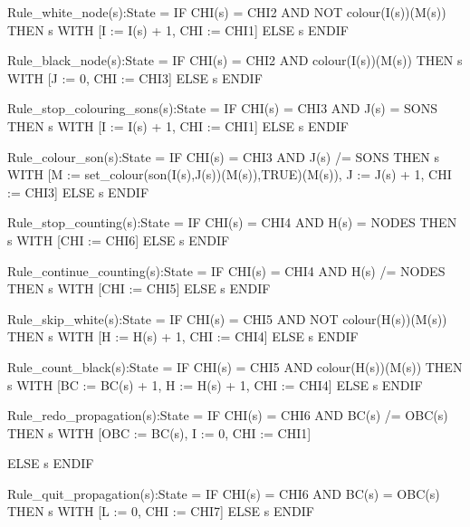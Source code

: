 \begin{smallsession}

  Rule_white_node(s):State =
    IF CHI(s) = CHI2 AND NOT colour(I(s))(M(s)) THEN
      s WITH [I := I(s) + 1,
              CHI := CHI1]
    ELSE 
      s
    ENDIF

  Rule_black_node(s):State =
    IF CHI(s) = CHI2 AND colour(I(s))(M(s)) THEN
      s WITH [J := 0,
              CHI := CHI3]
    ELSE 
      s
    ENDIF


  Rule_stop_colouring_sons(s):State =
    IF CHI(s) = CHI3 AND J(s) = SONS THEN
      s WITH [I := I(s) + 1,
              CHI := CHI1]
    ELSE 
      s
    ENDIF

  Rule_colour_son(s):State =
    IF CHI(s) = CHI3 AND J(s) /= SONS THEN
      s WITH [M := set_colour(son(I(s),J(s))(M(s)),TRUE)(M(s)),
              J := J(s) + 1,
              CHI := CHI3]
    ELSE 
      s
    ENDIF



  Rule_stop_counting(s):State =
    IF CHI(s) = CHI4 AND H(s) = NODES THEN
      s WITH [CHI := CHI6]
    ELSE 
      s
    ENDIF

  Rule_continue_counting(s):State =
    IF CHI(s) = CHI4 AND H(s) /= NODES THEN
      s WITH [CHI := CHI5]
    ELSE 
      s
    ENDIF


  Rule_skip_white(s):State =
    IF CHI(s) = CHI5 AND NOT colour(H(s))(M(s)) THEN
      s WITH [H := H(s) + 1,
              CHI := CHI4]
    ELSE 
      s
    ENDIF

  Rule_count_black(s):State =
    IF CHI(s) = CHI5 AND colour(H(s))(M(s)) THEN
      s WITH [BC := BC(s) + 1,
              H := H(s) + 1,
              CHI := CHI4]
    ELSE 
      s
    ENDIF


  Rule_redo_propagation(s):State =
    IF CHI(s) = CHI6 AND BC(s) /= OBC(s) THEN
      s WITH [OBC := BC(s),
              I := 0,
              CHI := CHI1]

    ELSE 
      s
    ENDIF

  Rule_quit_propagation(s):State =
    IF CHI(s) = CHI6 AND BC(s) = OBC(s) THEN
      s WITH [L := 0,
              CHI := CHI7]
    ELSE 
      s
    ENDIF


\end{smallsession}
